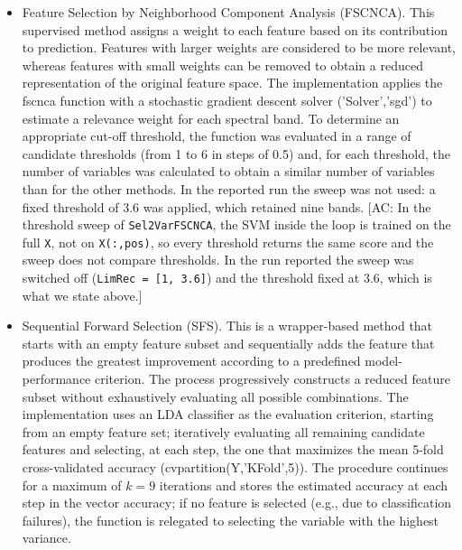 \documentclass[final,5p,times,twocolumn]{elsarticle}
\newcommand{\added}[1]{{\color{blue}#1}}
\newcommand{\acnote}[1]{{\color{red}\small\textsf{[AC: #1]}}}
\begin{document}
\begin{itemize}
    \item [-] Feature Selection by Neighborhood Component Analysis (FSCNCA).
    This supervised method assigns a weight to each feature based on its contribution to prediction. 
    Features with larger weights are considered to be more relevant, whereas features with small weights can be removed to obtain a reduced representation of the original feature space.
    The implementation applies the fscnca function with a stochastic gradient descent solver ('Solver','sgd') to estimate a relevance weight for each spectral band. 
    To determine an appropriate cut-off threshold, the function was evaluated in a range of candidate thresholds (from \added{1} to 6 in steps of 0.5) and, for each threshold, the number of variables was calculated to obtain a similar number of variables than for the other methods. \added{In the reported run the sweep was not used: a fixed threshold of 3.6 was applied, which retained nine bands.}
    \acnote{In the threshold sweep of \texttt{Sel2VarFSCNCA}, the SVM inside the loop is trained on the full \texttt{X}, not on \texttt{X(:,pos)}, so every threshold returns the same score and the sweep does not compare thresholds. In the run reported the sweep was switched off (\texttt{LimRec = [1, 3.6]}) and the threshold fixed at 3.6, which is what we state above.}
    
    \item [-] Sequential Forward Selection (SFS).
    This is a wrapper-based method that starts with an empty feature subset and sequentially adds the feature that produces the greatest improvement according to a predefined model-performance criterion.
    The process progressively constructs a reduced feature subset without exhaustively evaluating all possible combinations. 
    The implementation uses an LDA classifier as the evaluation criterion, starting from an empty feature set; iteratively evaluating all remaining candidate features and selecting, at each step, the one that maximizes the mean 5-fold cross-validated accuracy (cvpartition(Y,'KFold',5)). 
    The procedure continues for a maximum of \added{$k=9$} iterations and stores the estimated accuracy at each step in the vector accuracy; if no feature is selected (e.g., due to classification failures), the function is relegated to selecting the variable with the highest variance. 


\end{itemize}
\end{document}
